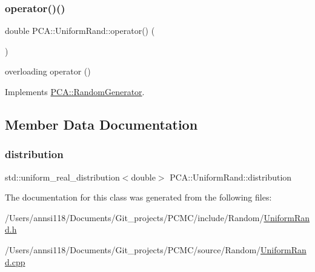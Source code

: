 \subsubsection{\texorpdfstring{operator()()}{operator()()}}
{\footnotesize\ttfamily double P\+C\+A\+::\+Uniform\+Rand\+::operator() (\begin{DoxyParamCaption}{ }\end{DoxyParamCaption})\hspace{0.3cm}{\ttfamily [virtual]}}



overloading operator () 



Implements \hyperlink{class_p_c_a_1_1_random_generator_a4361e39397900ae1e7b2cfa91a592509}{P\+C\+A\+::\+Random\+Generator}.



\subsection{Member Data Documentation}
\hypertarget{class_p_c_a_1_1_uniform_rand_abf0fad6934be0e79ead12a255a324252}{}\label{class_p_c_a_1_1_uniform_rand_abf0fad6934be0e79ead12a255a324252} 
\subsubsection{\texorpdfstring{distribution}{distribution}}
{\footnotesize\ttfamily std\+::uniform\+\_\+real\+\_\+distribution$<$double$>$ P\+C\+A\+::\+Uniform\+Rand\+::distribution\hspace{0.3cm}{\ttfamily [private]}}



The documentation for this class was generated from the following files\+:\begin{DoxyCompactItemize}
\item 
/\+Users/annsi118/\+Documents/\+Git\+\_\+projects/\+P\+C\+M\+C/include/\+Random/\hyperlink{_uniform_rand_8h}{Uniform\+Rand.\+h}\item 
/\+Users/annsi118/\+Documents/\+Git\+\_\+projects/\+P\+C\+M\+C/source/\+Random/\hyperlink{_uniform_rand_8cpp}{Uniform\+Rand.\+cpp}\end{DoxyCompactItemize}
